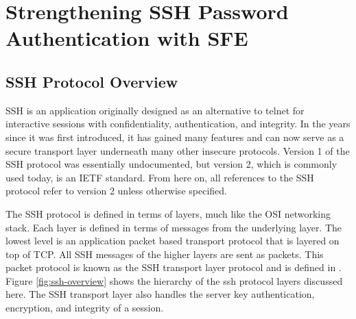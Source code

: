 
\chapter{Strengthening SSH Password Authentication with SFE}


\section{SSH Protocol Overview}

SSH is an application originally designed as an alternative to telnet
for interactive sessions with confidentiality, authentication, and
integrity. In the years since it was first introduced, it has gained
many features and can now serve as a secure transport layer underneath
many other insecure protocols. Version 1 of the SSH protocol was essentially
undocumented, but version 2, which is commonly used today, is an IETF
standard. From here on, all references to the SSH protocol refer to
version 2 unless otherwise specified.

The SSH protocol is defined in terms of layers, much like the OSI
networking stack. Each layer is defined in terms of messages from
the underlying layer. The lowest level is an application packet based
transport protocol that is layered on top of TCP. All SSH messages
of the higher layers are sent as packets. This packet protocol is
known as the SSH transport layer protocol and is defined in \cite{rfc4253}.
Figure \ref{fig:ssh-overview} shows the hierarchy of the ssh protocol
layers discussed here. The SSH transport layer also handles the server
key authentication, encryption, and integrity of a session. 

